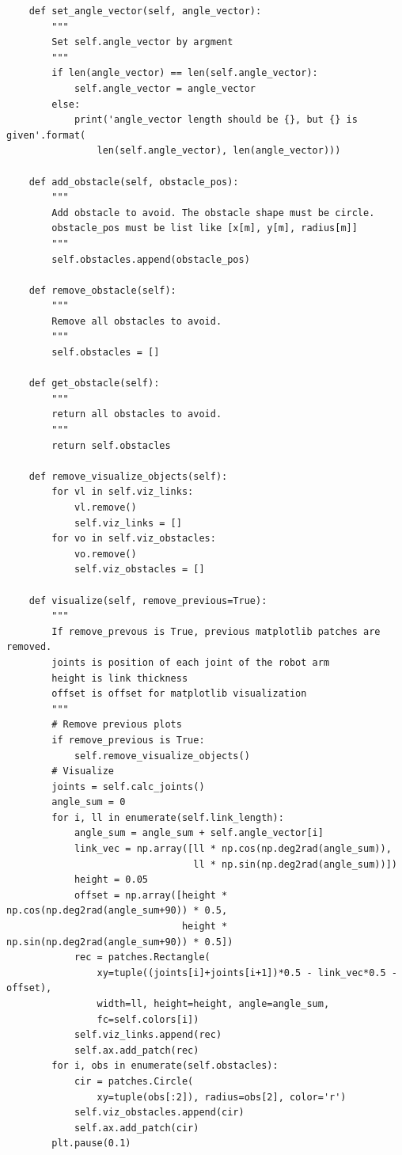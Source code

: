 \begin{verbatim}
    def set_angle_vector(self, angle_vector):
        """
        Set self.angle_vector by argment
        """
        if len(angle_vector) == len(self.angle_vector):
            self.angle_vector = angle_vector
        else:
            print('angle_vector length should be {}, but {} is given'.format(
                len(self.angle_vector), len(angle_vector)))

    def add_obstacle(self, obstacle_pos):
        """
        Add obstacle to avoid. The obstacle shape must be circle.
        obstacle_pos must be list like [x[m], y[m], radius[m]]
        """
        self.obstacles.append(obstacle_pos)

    def remove_obstacle(self):
        """
        Remove all obstacles to avoid.
        """
        self.obstacles = []

    def get_obstacle(self):
        """
        return all obstacles to avoid.
        """
        return self.obstacles

    def remove_visualize_objects(self):
        for vl in self.viz_links:
            vl.remove()
            self.viz_links = []
        for vo in self.viz_obstacles:
            vo.remove()
            self.viz_obstacles = []

    def visualize(self, remove_previous=True):
        """
        If remove_prevous is True, previous matplotlib patches are removed.
        joints is position of each joint of the robot arm
        height is link thickness
        offset is offset for matplotlib visualization
        """
        # Remove previous plots
        if remove_previous is True:
            self.remove_visualize_objects()
        # Visualize
        joints = self.calc_joints()
        angle_sum = 0
        for i, ll in enumerate(self.link_length):
            angle_sum = angle_sum + self.angle_vector[i]
            link_vec = np.array([ll * np.cos(np.deg2rad(angle_sum)),
                                 ll * np.sin(np.deg2rad(angle_sum))])
            height = 0.05
            offset = np.array([height * np.cos(np.deg2rad(angle_sum+90)) * 0.5,
                               height * np.sin(np.deg2rad(angle_sum+90)) * 0.5])
            rec = patches.Rectangle(
                xy=tuple((joints[i]+joints[i+1])*0.5 - link_vec*0.5 - offset),
                width=ll, height=height, angle=angle_sum,
                fc=self.colors[i])
            self.viz_links.append(rec)
            self.ax.add_patch(rec)
        for i, obs in enumerate(self.obstacles):
            cir = patches.Circle(
                xy=tuple(obs[:2]), radius=obs[2], color='r')
            self.viz_obstacles.append(cir)
            self.ax.add_patch(cir)
        plt.pause(0.1)



\end{verbatim}
